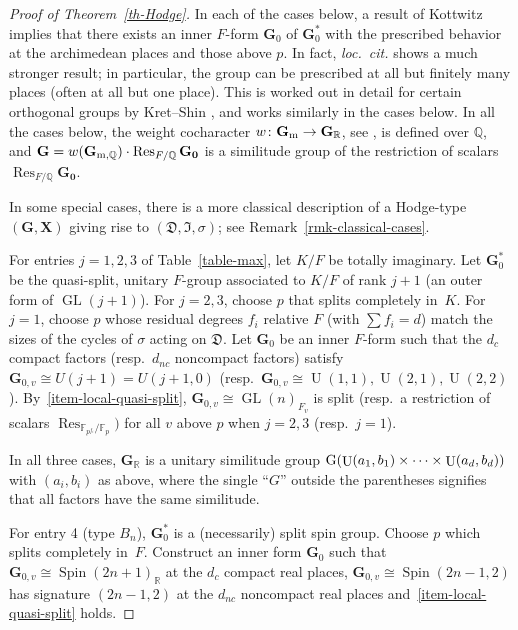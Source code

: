 \documentclass[11pt]{amsart}
\numberwithin{equation}{section}
\theoremstyle{definition}
\theoremstyle{remark}
\newcommand{\Dfr}{{\mathfrak D}}
\newcommand{\Ifr}{{\mathfrak I}}
\newcommand{\FF}{\mathbb{F}}
\newcommand{\QQ}{\mathbb{Q}}
\newcommand{\RR}{\mathbb{R}}
\newcommand{\gm}{\mathbf G_{\textnormal{m}}}
\newcommand{\gmq}{\mathbf G_{\textnormal{m},\QQ}}
\DeclareMathOperator{\res}{Res}
\DeclareMathOperator{\GL}{GL}
\DeclareMathOperator{\U}{U}
\newcommand{\gx}{(\mathbf G, \mathbf X)}
\newcommand{\loccit}{{\em loc.\ cit. }} %
\DeclareMathOperator{\Spin}{Spin}
\begin{document}
\begin{proof}[Proof of Theorem~\ref{th-Hodge}]
In each of the cases below, a result of Kottwitz \cite[Proposition~2.6]{Kottwitz-elliptic-singular} implies that there exists an inner $F$-form $\mathbf{G}_0$ of $\mathbf{G}_0^*$ with the prescribed behavior at the archimedean places and those above $p$. 
In fact, \loccit shows a much stronger result; in particular, the group can be prescribed at all but finitely many places (often at all but one place). This is worked out in detail for certain orthogonal groups by Kret--Shin \cite[Section~8]{Kret-Shin-GSO}, and works similarly in the cases below. In all the cases below, the weight cocharacter $w\colon \gm \to \mathbf{G}_{\RR}$, see \cite[Section~1.1.11]{Deligne-Shimura-varieties}, is defined over $\QQ$, and
$\mathbf{G}=w(\gmq)\cdot \res_{F/\QQ}\mathbf{G_0}$ is a similitude group of the restriction of scalars $\res_{F/\QQ}\mathbf{G_0}$.

In some special cases, there is a more classical description of a Hodge-type $\gx$ giving rise to $(\Dfr, \Ifr, \sigma)$; see Remark~\ref{rmk-classical-cases}.

For entries $j=1,2,3$ of Table~\ref{table-max}, let $K/F$ be totally imaginary. Let $\mathbf{G}_0^*$ be the quasi-split, unitary $F$-group associated to $K/F$ of rank $j+1$ (an outer form of $\GL(j+1)$). For $j=2,3$, choose $p$ that splits completely in~$K$. For $j=1$, choose $p$ whose residual degrees $f_i$ relative $F$ (with $\sum f_i=d$) match the sizes of the cycles of $\sigma$ acting on $\Dfr$.
Let  $\mathbf{G}_0$ be an inner  $F$-form  such that the $d_c$ compact factors (resp.\ $d_{nc}$ noncompact factors)  satisfy $\mathbf{G}_{0,v} \cong U(j+1)=U(j+1,0)$  (resp.\  $\mathbf{G}_{0,v} \cong \U(1,1), \U(2,1), \U(2,2)$). 
By~\eqref{item-local-quasi-split}, $\mathbf{G}_{0,v} \cong \GL(n)_{F_v}$ is split (resp.\ a restriction of scalars $\res_{\FF_{p^{f_i}}/\FF_p})$ for all $v$ above $p$ when $j=2,3$ (resp.\ $j=1$).    
   
 In all three cases, $\mathbf{G}_{\RR}$ is a unitary similitude group $\textnormal{G}(\U(a_1,b_1) \times \cdots \times \U(a_d, b_d))$ with $(a_i,b_i)$ as above, where the single ``$G$'' outside the parentheses signifies that all factors have the same similitude.

For entry 4 (type $B_n$), $\mathbf{G}_0^*$ is a (necessarily) split spin group. Choose  $p$ which  splits completely in~$F$. Construct an inner form $\mathbf{G}_0$ such that $\mathbf{G}_{0,v} \cong \Spin(2n+1)_{\RR}$ at the $d_c$ compact real places, $\mathbf{G}_{0,v} \cong \Spin(2n-1,2)$ has signature $(2n-1,2)$ at the  $d_{nc}$ noncompact real places  and~\eqref{item-local-quasi-split} holds. 


\end{proof}
\end{document}
